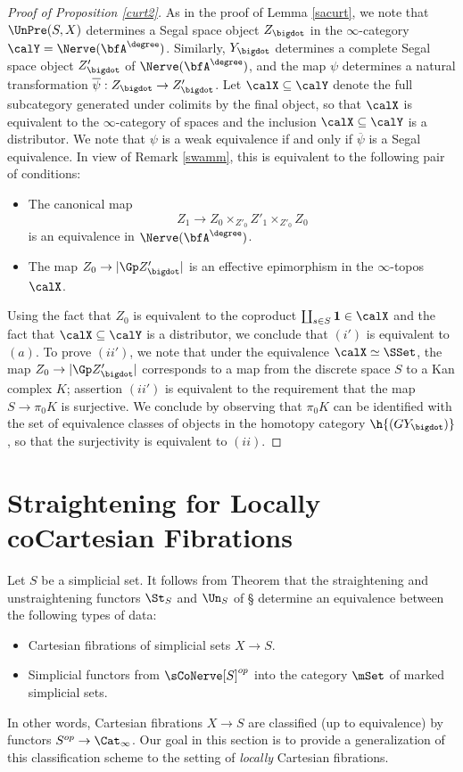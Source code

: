 \begin{proof}[Proof of Proposition \ref{curt2}]
As in the proof of Lemma \ref{sacurt}, we note that $\UnPre(S,X)$ determines a Segal space object $Z_{\bigdot}$ in the $\infty$-category $\calY = \Nerve( \bfA^{\degree})$. Similarly, $Y_{\bigdot}$ determines
a complete Segal space object $Z'_{\bigdot}$ of $\Nerve( \bfA^{\degree})$, and the map
$\psi$ determines a natural transformation $\overline{\psi}: Z_{\bigdot} \rightarrow Z'_{\bigdot}$. 
Let $\calX \subseteq \calY$ denote the full subcategory generated under colimits by the final object, so that $\calX$ is equivalent to the $\infty$-category of spaces and the inclusion $\calX \subseteq \calY$ is a distributor. We note that $\psi$ is a weak equivalence if and only if $\overline{\psi}$ is a Segal equivalence. In view of Remark \ref{swamm}, this is equivalent to the following pair of conditions:
\begin{itemize}
\item[$(i')$] The canonical map
$$ Z_1 \rightarrow Z_0 \times_{Z'_0} Z'_1 \times_{ Z'_0} Z_0$$
is an equivalence in $\Nerve( \bfA^{\degree} )$. 
\item[$(ii')$] The map $Z_0 \rightarrow | \Gp Z'_{\bigdot} |$ is an effective epimorphism
in the $\infty$-topos $\calX$.
\end{itemize}

Using the fact that $Z_0$ is equivalent to the coproduct $\coprod_{s \in S} {\bf 1} \in \calX$
and the fact that $\calX \subseteq \calY$ is a distributor, we conclude that $(i')$ is equivalent
to $(a)$. To prove $(ii')$, we note that under the equivalence $\calX \simeq \SSet$,
the map $Z_0 \rightarrow | \Gp Z'_{\bigdot} |$ corresponds to a map from
the discrete space $S$ to a Kan complex $K$; assertion $(ii')$ is equivalent to the requirement that
the map $S \rightarrow \pi_0 K$ is surjective. We conclude by observing that $\pi_0 K$
can be identified with the set of equivalence classes of objects in the homotopy category
$\h{(GY_{\bigdot})}$, so that the surjectivity is equivalent to $(ii)$.
\end{proof}

\section{Straightening for Locally coCartesian Fibrations}\label{bisecC}

Let $S$ be a simplicial set. It follows from Theorem  that the
straightening and unstraightening functors $\St_{S}$ and $\Un_{S}$ of \S {} determine an equivalence
between the following types of data:
\begin{itemize}
\item[$(1)$] Cartesian fibrations of simplicial sets $X \rightarrow S$.
\item[$(2)$] Simplicial functors from $\sCoNerve[S]^{op}$ into the category
$\mSet$ of marked simplicial sets.
\end{itemize}
In other words, Cartesian fibrations $X \rightarrow S$ are classified (up to equivalence)
by functors $S^{op} \rightarrow \Cat_{\infty}$. Our goal in this section is to provide a generalization of this classification scheme to the setting of {\em locally} Cartesian fibrations.

